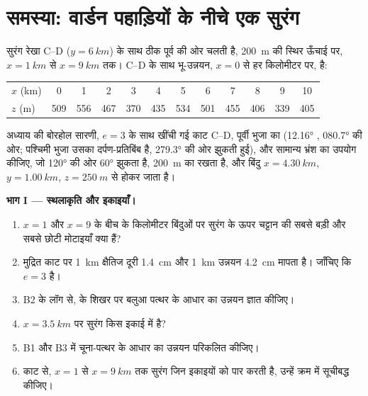 \section{समस्या: वार्डन पहाड़ियों के नीचे एक सुरंग}
\begin{problem}[{सप्ताहांत समस्या --- कौन-सी चट्टानें सुरंग काटेगी, वह भ्रंश से कहाँ मिलेगी, और वह कितना चूना-पत्थर खोदेगी}]
\label{pb:b1:cross-sections:1}
सुरंग रेखा C--D ($y = \qty{6}{km}$) के साथ ठीक पूर्व की ओर चलती है, \qty{200}{m} की स्थिर ऊँचाई पर, $x = \qty{1}{km}$ से
$x =
\qty{9}{km}$ तक। C--D के साथ भू-उन्नयन, $x = 0$ से हर किलोमीटर पर, है:
\begin{center}
\small
\begin{tabular}{lccccccccccc}
\hline
$x$ (km) & 0 & 1 & 2 & 3 & 4 & 5 & 6 & 7 & 8 & 9 & 10 \\
$z$ (m) & 509 & 556 & 467 & 370 & 435 & 534 & 501 & 455 & 406 & 339 & 405 \\
\hline
\end{tabular}
\end{center}
अध्याय की बोरहोल सारणी, $e = 3$ के साथ खींची गई काट C--D, पूर्वी भुजा का  (\ang{12.16} , \ang{080.7} की
ओर; पश्चिमी भुजा उसका दर्पण-प्रतिबिंब है, \ang{279.3} की ओर झुकती हुई), और सामान्य भ्रंश का उपयोग कीजिए, जो \ang{120}
की ओर \ang{60} झुकता है, \qty{200}{m} का  रखता है, और बिंदु $x = \qty{4.30}{km}$, $y = \qty{1.00}{km}$, $z = \qty{250}{m}$
से होकर जाता है।

\medskip
\noindent\textbf{भाग I --- स्थलाकृति और इकाइयाँ।}
\begin{enumerate}
  \item $x = 1$ और $x = 9$ के बीच के किलोमीटर बिंदुओं पर सुरंग के ऊपर चट्टान की सबसे बड़ी और सबसे छोटी मोटाइयाँ क्या हैं?
  \item मुद्रित काट पर \qty{1}{km} क्षैतिज दूरी \qty{1.4}{cm} और \qty{1}{km} उन्नयन \qty{4.2}{cm} मापता है। जाँचिए कि $e = 3$ है।
  \item B2 के लॉग से,  के शिखर पर बलुआ पत्थर के आधार का उन्नयन ज्ञात कीजिए।
  \item $x = \qty{3.5}{km}$ पर सुरंग किस इकाई में है?
  \item B1 और B3 में चूना-पत्थर के आधार का उन्नयन परिकलित कीजिए।
  \item काट से, $x = 1$ से $x = \qty{9}{km}$ तक सुरंग जिन इकाइयों को पार करती है, उन्हें क्रम में सूचीबद्ध कीजिए।
\end{enumerate}


\end{problem}
